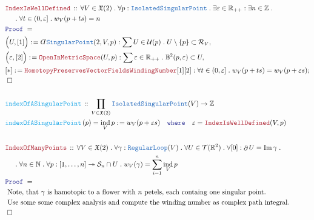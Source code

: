 \documentclass[12pt]{scrartcl}
\newcommand{\TYPE}[1]{\textcolor{NavyBlue}{\mathtt{#1}}}
\newcommand{\FUNC}[1]{\textcolor{Cerulean}{\mathtt{#1}}}
\newcommand{\LOGIC}[1]{\textcolor{Blue}{\mathtt{#1}}}
\newcommand{\THM}[1]{\textcolor{Maroon}{\mathtt{#1}}}
\renewcommand{\.}{\; . \;}
\newcommand{\de}{: \kern 0.1pc =}
\newcommand{\where}{\LOGIC{where}}
\newcommand{\Act}[1]{\left( #1 \right)}
\newcommand{\Theorem}[2]{& \THM{#1} \, :: \, #2 \\ & \Proof = \\ }
\newcommand{\DeclareFunc}[2]{& \FUNC{#1} \, :: \, #2 \\}
\newcommand{\DefineNamedFunc}[4]{&  \FUNC{#1}\Act{#2} = #3 \de #4 \\}
\newcommand{\NewLine}{\\ & \kern 1pc}
\newcommand{\Page}[1]{ \begin{align*} #1 \end{align*}   }
\newcommand{ \bd }{ \ByDef }
\newcommand{\Int}{\mathbb{Z} }
\newcommand{\Reals}{\mathbb{R} }
\newcommand{\Nat}{\mathbb{N} }
\DeclareMathOperator*{\im}{Im}
\newcommand{\ToSurj}{\twoheadrightarrow}
\newcommand{\Say}[3]{& #1 \de #2 : #3, \\}
\newcommand{\Conclude}[3]{& #1 \de #2 : #3; \\}
\newcommand{\QED}{\; \square}
\newcommand{\EndProof}{& \QED \\}
\newcommand{\ByDef}{\rotatebox[origin=c]{-180}{$D$}}%
\newcommand{\Proof}{\LOGIC{Proof} \; }
\DeclareMathOperator*{\boundary}{\partial}
\newcommand{\T}{\mathcal{T}}
\newcommand{\U}{\mathcal{U}}
\DeclareMathOperator{\ind}{ind}
\newcommand{\VF}{\mathfrak{X}}
\begin{document}
\Page{
	\Theorem{IndexIsWellDefined}
	{
		\forall V \in \VF(2) \.
		\forall p : \TYPE{IsolatedSingularPoint} \.
		\exists \varepsilon \in \Reals_{++} :
		\exists n \in \Int \. \NewLine \. 
		\forall t \in (0,\varepsilon] \.
		w_V(p + ts) = n
	}
	\Say{\Big(U,[1]\Big)}{\bd \TYPE{SingularPoint}(2,V,p)}
	{
		\sum U \in \U(p) \. 
		U \setminus \{p\} \subset \mathcal{R}_V
	}
	\Say{\Big( \varepsilon,[2] \Big)}{\THM{OpenInMetricSpace}(U,p)}
	{
		\sum \varepsilon \in \Reals_{++} \. 
		\mathbb{B}^2(p,\varepsilon) \subset U
	}
	\Conclude{[*]}{
		\THM{HomotopyPreservesVectorFieldsWindingNumber}[1][2]
	}
	{
		\forall t \in (0,\varepsilon] \.
		w_V(p + ts) = w_V(p + \varepsilon s) 
	}
	\EndProof
	\\
	\DeclareFunc{indexOfASingularPoint}{\prod_{V \in \VF(2)} \TYPE{IsolatedSingularPoint}(V) \to \Int}
	\DefineNamedFunc{indexOfASingularPoint}{ p }{ \ind_V p }
	{
		w_V(p + \varepsilon s) \quad \where \quad \varepsilon = \THM{IndexIsWellDefined}(V,p)
	}
	\\
	\Theorem{IndexOfManyPoints}
	{
		\forall V \in \VF(2) \.
		\forall \gamma : \TYPE{RegularLoop}(V) \.
		\forall U \in \T(\Reals^2) \.
		\forall [0] : \boundary U =  \im \gamma \. \NewLine \.
		\forall n \in \Nat \.
		\forall p : [1,\ldots,n] \ToSurj \mathcal{S}_n \cap U \.
		w_V(\gamma) = \sum^n_{i=1} \ind_V p
	}
	& \text{ 
		Note, that $\gamma$ is hamotopic to a flower with $n$ petels, each containg one singular point. }\\
	&\text{	Use some some complex analysis and compute the winding number as complex path integral. 
	} \\
	\EndProof
}
\newpage
\end{document}

